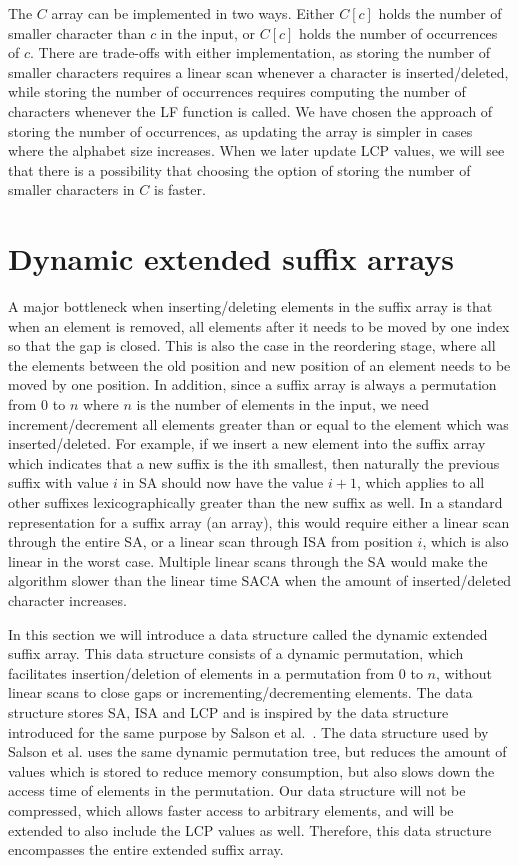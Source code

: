 
The $C$ array can be implemented in two ways. Either $C[c]$ holds the number of smaller
character than $c$ in the input, or $C[c]$ holds the number of occurrences of $c$. There
are trade-offs with either implementation, as storing the number of smaller characters
requires a linear scan whenever a character is inserted/deleted, while storing the number
of occurrences requires computing the number of characters whenever the LF function is
called. We have chosen the approach of storing the number of occurrences, as updating the
array is simpler in cases where the alphabet size increases. When we later update LCP
values, we will see that there is a possibility that choosing the option of storing the
number of smaller characters in $C$ is faster. 

\section{Dynamic extended suffix arrays}

A major bottleneck when inserting/deleting elements in the suffix array is that when an
element is removed, all elements after it needs to be moved by one index so that the gap
is closed. This is also the case in the reordering stage, where all the elements between
the old position and new position of an element needs to be moved by one position. In
addition, since a suffix array is always a permutation from $0$ to $n$ where $n$ is the
number of elements in the input, we need increment/decrement all elements greater than or
equal to the element which was inserted/deleted. For example, if we insert a new element
into the suffix array which indicates that a new suffix is the ith smallest, then
naturally the previous suffix with value $i$ in SA should now have the value $i + 1$,
which applies to all other suffixes lexicographically greater than the new suffix as well.
In a standard representation for a suffix array (an array), this would require either a
linear scan through the entire SA, or a linear scan through ISA from position $i$, which
is also linear in the worst case. Multiple linear scans through the SA would make the
algorithm slower than the linear time SACA when the amount of inserted/deleted character
increases. 

In this section we will introduce a data structure called the dynamic extended suffix
array. This data structure consists of a dynamic permutation, which facilitates
insertion/deletion of elements in a permutation from $0$ to $n$, without linear scans to
close gaps or incrementing/decrementing elements. The data structure stores SA, ISA and
LCP and is inspired by the data structure introduced for the same purpose by Salson et
al.~\cite{DynamicExtendedSuffixArrays}. The data structure used by Salson et al. uses the
same dynamic permutation tree, but reduces the amount of values which is stored to reduce
memory consumption, but also slows down the access time of elements in the permutation.
Our data structure will not be compressed, which allows faster access to arbitrary
elements, and will be extended to also include the LCP values as well. Therefore, this
data structure encompasses the entire extended suffix array.

